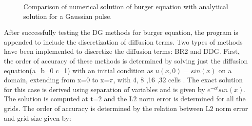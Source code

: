 \documentclass[12pt]{elsarticle}
\begin{document}
\begin{figure}[ht]
\centering
{}
%
%
\caption{Comparison of numerical solution of burger equation with analytical solution for a Gaussian pulse.}
\label{gaussian}
\end{figure}

\clearpage
After successfully testing the DG methods for burger equation, the program is appended to include the discretization of diffusion terms. Two types of methods have been implemented to discretize the diffusion terms: BR2 and DDG. First, the order of accuracy of these methods is determined by solving just the diffusion equation(a=b=0 c=1) with an initial condition as $u(x,0)=sin(x)$ on a domain, extending from x=0 to x=$\pi$, with 4, 8 ,16 ,32 cells . The exact solution for this case is derived using separation of variables and is given by $e^{-ct} sin(x)$. The solution is computed at t=2 and the L2 norm error is determined for all the grids.  The order of accuracy is determined by the relation between L2 norm error and grid size given by:
\end{document}
